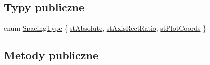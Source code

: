 \subsection*{Typy publiczne}
\begin{DoxyCompactItemize}
\item 
enum \hyperlink{class_q_c_p_bars_group_a4c0521120a97e60bbca37677a37075b6}{Spacing\+Type} \{ \hyperlink{class_q_c_p_bars_group_a4c0521120a97e60bbca37677a37075b6ab53fa3efaf14867dd0f14d41d64e42ac}{st\+Absolute}, 
\hyperlink{class_q_c_p_bars_group_a4c0521120a97e60bbca37677a37075b6ae94b05c27bc985dcdd8b1e1b7f163d26}{st\+Axis\+Rect\+Ratio}, 
\hyperlink{class_q_c_p_bars_group_a4c0521120a97e60bbca37677a37075b6ad369cee6287e0a86e8c2b643a3168c54}{st\+Plot\+Coords}
 \}
\end{DoxyCompactItemize}
\subsection*{Metody publiczne}
